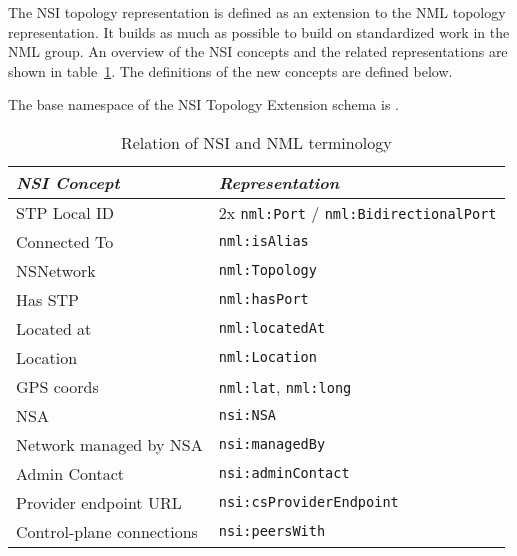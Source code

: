 \documentclass[12pt]{article}  %
\begin{document}
 The NSI topology representation is defined as an extension to the NML topology 
representation. It builds as much as possible to build on standardized work in the NML group.
An overview of the NSI concepts and the related representations are shown in table~\ref{tab:nsi-nml}.
The definitions of the new concepts are defined below.

The base namespace of the NSI Topology Extension schema is .

\begin{table}
\begin{center}

  \begin{tabular}{|l|l|}
\hline
     \textit{NSI Concept} &                               \textit{Representation}\\
\hline
             STP Local ID & 2x \texttt{nml:Port} / \texttt{nml:BidirectionalPort}\\
\hline
             Connected To &                                  \texttt{nml:isAlias}\\
\hline
                NSNetwork &                                 \texttt{nml:Topology}\\
\hline
                  Has STP &                                  \texttt{nml:hasPort}\\
\hline
               Located at &                                \texttt{nml:locatedAt}\\
\hline
                 Location &                                 \texttt{nml:Location}\\
\hline
               GPS coords &                   \texttt{nml:lat}, \texttt{nml:long}\\
\hline
                      NSA &                                      \texttt{nsi:NSA}\\
\hline
   Network managed by NSA &                                \texttt{nsi:managedBy}\\
\hline
            Admin Contact &                             \texttt{nsi:adminContact}\\
\hline
    Provider endpoint URL &                       \texttt{nsi:csProviderEndpoint}\\
\hline
Control-plane connections &                                \texttt{nsi:peersWith}\\
\hline
\end{tabular}
\caption{Relation of NSI and NML terminology}\label{tab:nsi-nml}
  \end{center}
\end{table}
\end{document}
